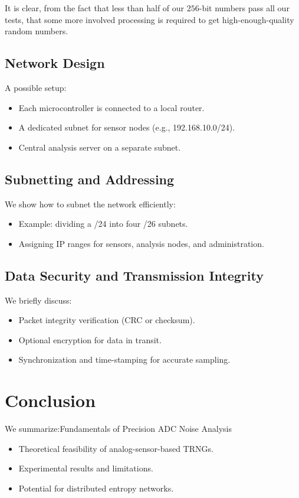 It is clear, from the fact that less than half of our \(256\)-bit 
numbers pass all our tests, that some more involved processing 
is required to get high-enough-quality random numbers.

\subsection{Network Design}
A possible setup:
\begin{itemize}
    \item Each microcontroller is connected to a local router.
    \item A dedicated subnet for sensor nodes (e.g., 192.168.10.0/24).
    \item Central analysis server on a separate subnet.
\end{itemize}

\subsection{Subnetting and Addressing}
We show how to subnet the network efficiently:
\begin{itemize}
    \item Example: dividing a /24 into four /26 subnets.
    \item Assigning IP ranges for sensors, analysis nodes, and administration.
\end{itemize}

\subsection{Data Security and Transmission Integrity}
We briefly discuss:
\begin{itemize}
    \item Packet integrity verification (CRC or checksum).
    \item Optional encryption for data in transit.
    \item Synchronization and time-stamping for accurate sampling.
\end{itemize}

\newpage
\section{Conclusion}
We summarize:Fundamentals of Precision ADC
Noise Analysis
\begin{itemize}
    \item Theoretical feasibility of analog-sensor-based TRNGs.
    \item Experimental results and limitations.
    \item Potential for distributed entropy networks.
\end{itemize}

